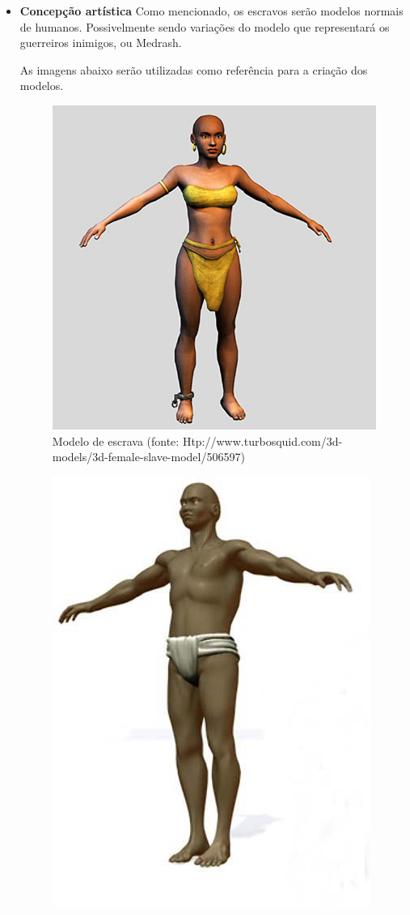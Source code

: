 \begin{itemize}
\item{\bf Concepção artística}
Como mencionado, os escravos serão modelos normais de humanos. Possivelmente sendo variações do modelo que representará os guerreiros inimigos, ou Medrash.


As imagens abaixo serão utilizadas como referência para a criação dos modelos.

\begin{figure}[H]
 \centering
 \includegraphics[scale=0.5]{Imagens/mulher01.png}
 \caption{Modelo de escrava (fonte: Htp://www.turbosquid.com/3d-models/3d-female-slave-model/506597)}
\label{img:mulher}
\end{figure}
\newpage
\begin{figure}[H]
 \centering
 \includegraphics[scale=0.5]{Imagens/escravo01.png}

\end{figure}
\end{itemize}
